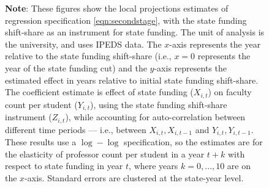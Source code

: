 \begin{figure}[H]
\begin{subfigure}[b]{0.495\textwidth}
        \label{fig:all-count-lp}
    \end{subfigure}
    \label{fig:count-lp}
    \vspace{-1cm}
    \justify
    \footnotesize
    \textbf{Note}:
    These figures show the local projections estimates of regression specification \eqref{eqn:secondstage}, with the state funding shift-share as an instrument for state funding.
    The unit of analysis is the university, and uses IPEDS data.
    The $x$-axis represents the year relative to the state funding shift-share (i.e., $x = 0$ represents the year of the state funding cut) and the $y$-axis represents the estimated effect in years relative to initial state funding shift-share.
    The coefficient estimate is effect of state funding ($X_{i,t}$) on faculty count per student ($Y_{i,t}$), using the state funding shift-share instrument ($Z_{i,t}$), while accounting for auto-correlation between different time periods --- i.e., between $X_{i,t}, X_{i,t-1}$ and $Y_{i,t}, Y_{i,t-1}$.
    These results use a $\log-\log$ specification, so the estimates are for the elasticity of professor count per student in a year $t+k$ with respect to state funding in year $t$, where years $k = 0, \hdots, 10$ are on the $x$-axis. 
    Standard errors are clustered at the state-year level.
\end{figure}

